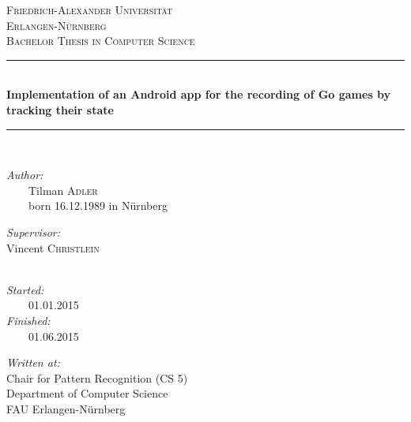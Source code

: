 \documentclass[english,bt]{package/lmedoc}
\begin{document}
\setlength{\marginparwidth}{2.5cm}
\listoftodos
\cleardoublepage

\begin{titlepage}

\begin{center}
\textsc{\LARGE Friedrich-Alexander Universität \\ Erlangen-Nürnberg}\\[1cm]
\textsc{\Large Bachelor Thesis in Computer Science}\\[1.1cm]

\newcommand{\HRule}{\rule{\linewidth}{0.5mm}}
\HRule \\[0.4cm]
{ \huge \bfseries Implementation of an Android app for the recording of Go games by tracking their state }
\HRule \\[2.5cm]

\begin{minipage}{0.5\textwidth}
\begin{flushleft} \large
\emph{Author:}\\
\ \ \ \ Tilman \textsc{Adler}\\
\ \ \ \ born 16.12.1989 in Nürnberg
\end{flushleft}
\end{minipage}
\hfill
\begin{minipage}{0.4\textwidth}
\begin{flushright} \large
\emph{Supervisor:} \\
Vincent \textsc{Christlein}\\
~
\end{flushright}
\end{minipage}

\vspace{1.8cm}

\begin{minipage}{0.3\textwidth}
\begin{flushleft} \large
\emph{Started:}\\
\ \ \ \ 01.01.2015\\
\emph{Finished:}\\
\ \ \ \ 01.06.2015
\end{flushleft}
\end{minipage}
\hfill
\begin{minipage}{0.6\textwidth}
\begin{flushright} \large
\emph{Written at:} \\
Chair for Pattern Recognition (CS 5)\\
Department of Computer Science\\
FAU Erlangen-Nürnberg
\end{flushright}
\end{minipage}


\end{center}
\end{titlepage}
\end{document}
